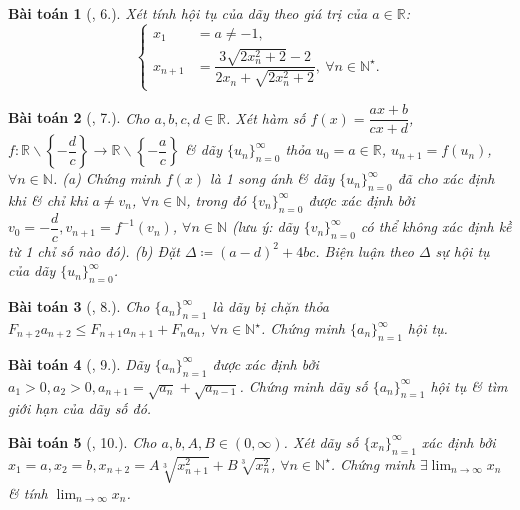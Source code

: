 \documentclass[oneside]{book}
\newtheorem{baitoan}{Bài toán}
\begin{document}
\begin{baitoan}[\cite{TLCT_dai_so_giai_tich_11}, 6.]
	Xét tính hội tụ của dãy theo giá trị của $a\in\mathbb{R}$:
	\begin{equation*}
		\left\{\begin{split}
			x_1 &= a\ne-1,\\
			x_{n+1} &= \dfrac{3\sqrt{2x_n^2 + 2} - 2}{2x_n + \sqrt{2x_n^2 + 2}},\ \forall n\in\mathbb{N}^\star.
		\end{split}\right.
	\end{equation*}
\end{baitoan}

\begin{baitoan}[\cite{TLCT_dai_so_giai_tich_11}, 7.]
	Cho $a,b,c,d\in\mathbb{R}$. Xét hàm số $f(x) = \dfrac{ax + b}{cx + d}$, $f:\mathbb{R}\backslash\left\{-\dfrac{d}{c}\right\}\to\mathbb{R}\backslash\left\{-\dfrac{a}{c}\right\}$ \& dãy $\{u_n\}_{n=0}^\infty$ thỏa $u_0 = a\in\mathbb{R}$, $u_{n+1} = f(u_n)$, $\forall n\in\mathbb{N}$. (a) Chứng minh $f(x)$ là 1 song ánh \& dãy $\{u_n\}_{n=0}^\infty$ đã cho xác định khi \& chỉ khi $a\ne v_n$, $\forall n\in\mathbb{N}$, trong đó $\{v_n\}_{n=0}^\infty$ được xác định bởi $v_0 = -\dfrac{d}{c},v_{n+1} = f^{-1}(v_n)$, $\forall n\in\mathbb{N}$ (lưu ý: dãy $\{v_n\}_{n=0}^\infty$ có thể không xác định kề từ 1 chỉ số nào đó). (b) Đặt $\Delta\coloneqq(a - d)^2 + 4bc$. Biện luận theo $\Delta$ sự hội tụ của dãy $\{u_n\}_{n=0}^\infty$.
\end{baitoan}

\begin{baitoan}[\cite{TLCT_dai_so_giai_tich_11}, 8.]
	Cho $\{a_n\}_{n=1}^\infty$ là dãy bị chặn thỏa $F_{n+2}a_{n+2}\le F_{n+1}a_{n+1} + F_na_n$, $\forall n\in\mathbb{N}^\star$. Chứng minh $\{a_n\}_{n=1}^\infty$ hội tụ.
\end{baitoan}

\begin{baitoan}[\cite{TLCT_dai_so_giai_tich_11}, 9.]
	Dãy $\{a_n\}_{n=1}^\infty$ được xác định bởi $a_1 > 0,a_2 > 0,a_{n+1} = \sqrt{a_n} + \sqrt{a_{n-1}}$. Chứng minh dãy số $\{a_n\}_{n=1}^\infty$ hội tụ \& tìm giới hạn của dãy số đó.
\end{baitoan}

\begin{baitoan}[\cite{TLCT_dai_so_giai_tich_11}, 10.]
	Cho $a,b,A,B\in(0,\infty)$. Xét dãy số $\{x_n\}_{n=1}^\infty$ xác định bởi $x_1 = a,x_2 = b,x_{n+2} = A\sqrt[3]{x_{n+1}^2} + B\sqrt[3]{x_n^2}$, $\forall n\in\mathbb{N}^\star$. Chứng minh $\exists\lim_{n\to\infty} x_n$ \& tính $\lim_{n\to\infty} x_n$.
\end{baitoan}
\end{document}

